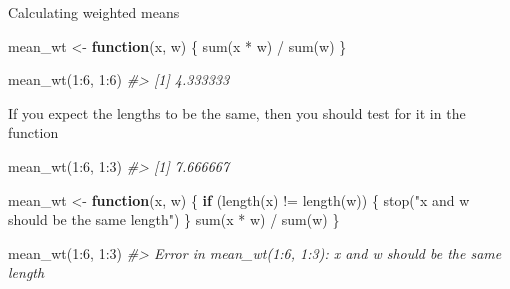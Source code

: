 \documentclass[
]{book}
\newenvironment{Shaded}{\begin{snugshade}}{\end{snugshade}}
\newcommand{\CommentTok}[1]{\textcolor[rgb]{0.56,0.35,0.01}{\textit{#1}}}
\newcommand{\ControlFlowTok}[1]{\textcolor[rgb]{0.13,0.29,0.53}{\textbf{#1}}}
\newcommand{\DecValTok}[1]{\textcolor[rgb]{0.00,0.00,0.81}{#1}}
\newcommand{\FunctionTok}[1]{\textcolor[rgb]{0.00,0.00,0.00}{#1}}
\newcommand{\NormalTok}[1]{#1}
\newcommand{\OtherTok}[1]{\textcolor[rgb]{0.56,0.35,0.01}{#1}}
\newcommand{\SpecialCharTok}[1]{\textcolor[rgb]{0.00,0.00,0.00}{#1}}
\newcommand{\StringTok}[1]{\textcolor[rgb]{0.31,0.60,0.02}{#1}}
\begin{document}
Calculating weighted means

\begin{Shaded}
\begin{Highlighting}[]
\NormalTok{mean\_wt }\OtherTok{\textless{}{-}} \ControlFlowTok{function}\NormalTok{(x, w) \{}
  \FunctionTok{sum}\NormalTok{(x }\SpecialCharTok{*}\NormalTok{ w) }\SpecialCharTok{/} \FunctionTok{sum}\NormalTok{(w)}
\NormalTok{\}}
\end{Highlighting}
\end{Shaded}

\begin{Shaded}
\begin{Highlighting}[]
\FunctionTok{mean\_wt}\NormalTok{(}\DecValTok{1}\SpecialCharTok{:}\DecValTok{6}\NormalTok{, }\DecValTok{1}\SpecialCharTok{:}\DecValTok{6}\NormalTok{)}
\CommentTok{\#\textgreater{} [1] 4.333333}
\end{Highlighting}
\end{Shaded}

If you expect the lengths to be the same,
then you should test for it in the function

\begin{Shaded}
\begin{Highlighting}[]
\FunctionTok{mean\_wt}\NormalTok{(}\DecValTok{1}\SpecialCharTok{:}\DecValTok{6}\NormalTok{, }\DecValTok{1}\SpecialCharTok{:}\DecValTok{3}\NormalTok{)}
\CommentTok{\#\textgreater{} [1] 7.666667}
\end{Highlighting}
\end{Shaded}

\begin{Shaded}
\begin{Highlighting}[]
\NormalTok{mean\_wt }\OtherTok{\textless{}{-}} \ControlFlowTok{function}\NormalTok{(x, w) \{}
  \ControlFlowTok{if}\NormalTok{ (}\FunctionTok{length}\NormalTok{(x) }\SpecialCharTok{!=} \FunctionTok{length}\NormalTok{(w)) \{}
    \FunctionTok{stop}\NormalTok{(}\StringTok{"\textasciigrave{}x\textasciigrave{} and \textasciigrave{}w\textasciigrave{} should be the same length"}\NormalTok{)}
\NormalTok{  \}}
  \FunctionTok{sum}\NormalTok{(x }\SpecialCharTok{*}\NormalTok{ w) }\SpecialCharTok{/} \FunctionTok{sum}\NormalTok{(w)}
\NormalTok{\}}
\end{Highlighting}
\end{Shaded}

\begin{Shaded}
\begin{Highlighting}[]
\FunctionTok{mean\_wt}\NormalTok{(}\DecValTok{1}\SpecialCharTok{:}\DecValTok{6}\NormalTok{, }\DecValTok{1}\SpecialCharTok{:}\DecValTok{3}\NormalTok{)}
\CommentTok{\#\textgreater{} Error in mean\_wt(1:6, 1:3): \textasciigrave{}x\textasciigrave{} and \textasciigrave{}w\textasciigrave{} should be the same length}
\end{Highlighting}
\end{Shaded}
\end{document}

